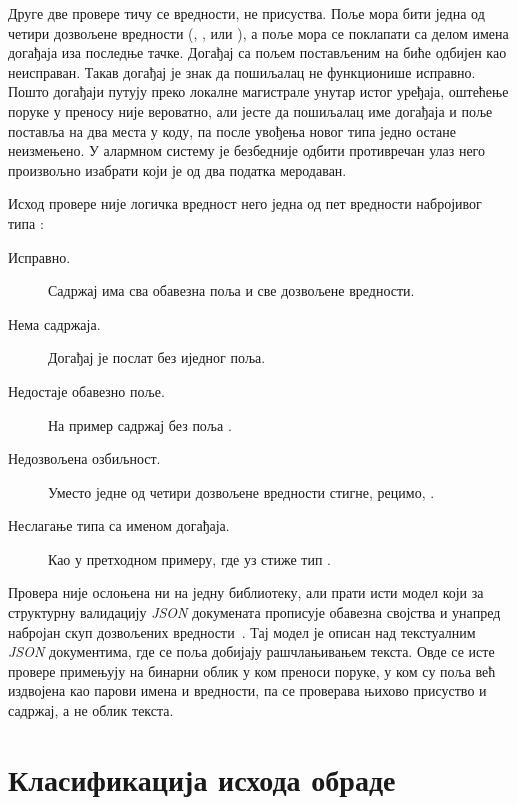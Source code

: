 \documentclass[12pt,oneside]{memoir}
\begin{document}
Друге две провере тичу се вредности, не присуства. Поље  мора бити једна од
четири дозвољене вредности (, ,  или ), а
поље  мора се поклапати са делом имена догађаја иза последње тачке. Догађај
 са пољем  постављеним на  биће одбијен као
неисправан. Такав догађај је знак да пошиљалац не функционише исправно. Пошто догађаји путују преко 
локалне магистрале унутар истог уређаја, оштећење поруке у преносу није вероватно, 
али јесте да пошиљалац име догађаја и поље  поставља на два места у коду, 
па после увођења новог типа једно остане неизмењено. У алармном систему је безбедније одбити 
противречан улаз него произвољно изабрати који је од два податка меродаван.

Исход провере није логичка вредност него једна од пет вредности набројивог типа
:

\begin{description}
  \item[Исправно.] Садржај има сва обавезна поља и све дозвољене вредности.
  \item[Нема садржаја.] Догађај је послат без иједног поља.
  \item[Недостаје обавезно поље.] На пример садржај без поља .
  \item[Недозвољена озбиљност.] Уместо једне од четири дозвољене вредности стигне,
        рецимо, .
  \item[Неслагање типа са именом догађаја.] Као у претходном примеру, где уз
         стиже тип .
\end{description}

Провера није ослоњена ни на једну библиотеку, али прати исти модел који за структурну
валидацију \emph{JSON} докумената прописује обавезна својства и унапред набројан скуп
дозвољених вредности~\cite{JsonSchemaValidation}. Тај модел је описан над текстуалним
\emph{JSON} документима, где се поља добијају рашчлањивањем текста. Овде се исте провере
примењују на бинарни облик у ком  преноси поруке, у ком су поља већ издвојена
као парови имена и вредности, па се проверава њихово присуство и садржај, а не облик текста.

\section{Класификација исхода обраде}
\label{sec:klasifikacija}
\end{document}
